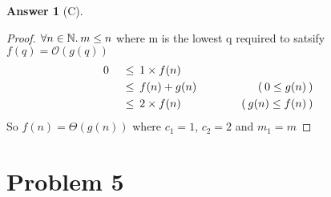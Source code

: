 \documentclass{article}
\theoremstyle{definition}
\newtheorem*{answer}{Answer}
\newcommand{\evidence}[1]{\ensuremath{\hspace{3em} (\hspace{0.2em} \text{#1} \hspace{0.2em})}}
\newcommand{\asymptotic}[3]{\ensuremath{#2 = #1(#3)}}
\newcommand{\bigO}[2]{\asymptotic{\mathcal{O}}{#1}{#2}}
\newcommand{\bigTheta}[2]{\asymptotic{\Theta}{#1}{#2}}
\newcommand{\relation}[1]{\ensuremath{\hspace{0.2em} {{} #1 {}} \hspace{0.2em}}}
\newcommand{\lesseq}{\relation{\le}}
\newcommand{\quantify}[2]{\ensuremath{\forall #1 \in \mathbb{#2}. \hspace{0.2em}}}
\begin{document}
\begin{answer}[C]
  
  \hfill
  \begin{proof}
    $\quantify{n}{N} m \le n$ where m is the lowest q required to satsify $\bigO{f(q)}{g(q)}$
    \begin{alignat*}{4}
      & 0  & \lesseq & 1 \times f(n)          & {} \\
      & {} & \lesseq & f(n) + g(n)   & \evidence{$0 \le g(n)$} \\
      & {} & \lesseq & 2 \times f(n) & \evidence{$g(n) \le f(n)$}
  \end{alignat*}
  So $\bigTheta{f(n)}{g(n)}$ where $c_1 = 1$, $c_2 = 2$ and $m_1 = m$ \qedhere
  \end{proof}
\end{answer}

\section*{Problem 5}
\end{document}
